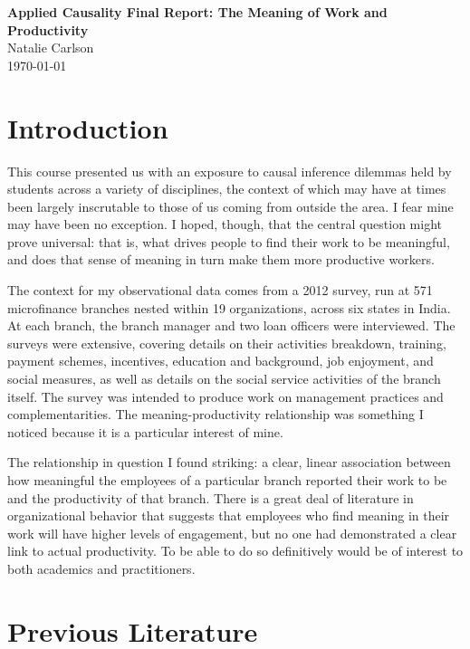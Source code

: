 \documentclass[12pt]{article}
\begin{document}
\begin{center}
  \Large \textbf{Applied Causality Final Report: The Meaning of Work and Productivity} \\
  \vspace{0.1in}
  \normalsize Natalie Carlson \\
  \today
\end{center}


\section{Introduction}

This course presented us with an exposure to causal inference dilemmas held by students across a variety of disciplines, the context of which may have at times been largely inscrutable to those of us coming from outside the area. I fear mine may have been no exception. I hoped, though, that the central question might prove universal: that is, what drives people to find their work to be meaningful, and does that sense of meaning in turn make them more productive workers. 

The context for my observational data comes from a 2012 survey, run at 571 microfinance branches nested within 19 organizations, across six states in India. At each branch, the branch manager and two loan officers were interviewed. The surveys were extensive, covering details on their activities breakdown, training, payment schemes, incentives, education and background, job enjoyment, and social measures, as well as details on the social service activities of the branch itself. The survey was intended to produce work on management practices and complementarities. The meaning-productivity relationship was something I noticed because it is a particular interest of mine.

The relationship in question I found striking: a clear, linear association between how meaningful the employees of a particular branch reported their work to be and the productivity of that branch. There is a great deal of literature in organizational behavior that suggests that employees who find meaning in their work will have higher levels of engagement, but no one had demonstrated a clear link to actual productivity. To be able to do so definitively would be of interest to both academics and practitioners.


\section{Previous Literature}
\end{document}
